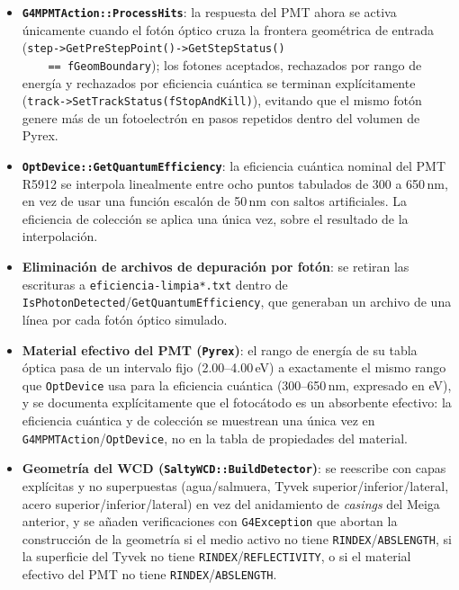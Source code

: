 \documentclass[11pt,a4paper]{article}
\newcommand{\codigo}[1]{\nolinkurl{#1}}
\begin{document}
\begin{itemize}
  \item \textbf{\codigo{G4MPMTAction::ProcessHits}}: la respuesta del PMT
    ahora se activa únicamente cuando el fotón óptico cruza la frontera
    geométrica de entrada (\codigo{step->GetPreStepPoint()->GetStepStatus()
    == fGeomBoundary}); los fotones aceptados, rechazados por rango de
    energía y rechazados por eficiencia cuántica se terminan explícitamente
    (\codigo{track->SetTrackStatus(fStopAndKill)}), evitando que el mismo
    fotón genere más de un fotoelectrón en pasos repetidos dentro del
    volumen de Pyrex.
  \item \textbf{\codigo{OptDevice::GetQuantumEfficiency}}: la eficiencia
    cuántica nominal del PMT R5912 se interpola linealmente entre ocho
    puntos tabulados de 300 a 650\,nm, en vez de usar una función escalón
    de 50\,nm con saltos artificiales. La eficiencia de colección se aplica
    una única vez, sobre el resultado de la interpolación.
  \item \textbf{Eliminación de archivos de depuración por fotón}: se
    retiran las escrituras a \codigo{eficiencia-limpia*.txt} dentro de
    \codigo{IsPhotonDetected}/\codigo{GetQuantumEfficiency}, que generaban
    un archivo de una línea por cada fotón óptico simulado.
  \item \textbf{Material efectivo del PMT (\codigo{Pyrex})}: el rango de
    energía de su tabla óptica pasa de un intervalo fijo (2.00--4.00\,eV)
    a exactamente el mismo rango que \codigo{OptDevice} usa para la
    eficiencia cuántica (300--650\,nm, expresado en eV), y se documenta
    explícitamente que el fotocátodo es un absorbente efectivo: la
    eficiencia cuántica y de colección se muestrean una única vez en
    \codigo{G4MPMTAction}/\codigo{OptDevice}, no en la tabla de
    propiedades del material.
  \item \textbf{Geometría del WCD (\codigo{SaltyWCD::BuildDetector})}: se
    reescribe con capas explícitas y no superpuestas (agua/salmuera,
    Tyvek superior/inferior/lateral, acero superior/inferior/lateral) en
    vez del anidamiento de \emph{casings} del Meiga anterior, y se añaden
    verificaciones con \codigo{G4Exception} que abortan la construcción de
    la geometría si el medio activo no tiene \codigo{RINDEX}/\codigo{ABSLENGTH},
    si la superficie del Tyvek no tiene \codigo{RINDEX}/\codigo{REFLECTIVITY},
    o si el material efectivo del PMT no tiene \codigo{RINDEX}/\codigo{ABSLENGTH}.
\end{itemize}
\end{document}
